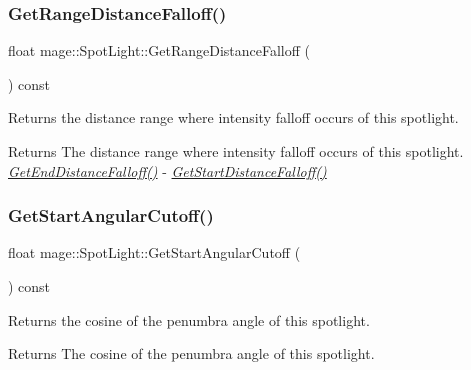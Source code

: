 \subsubsection{\texorpdfstring{Get\+Range\+Distance\+Falloff()}{GetRangeDistanceFalloff()}}
{\footnotesize\ttfamily float mage\+::\+Spot\+Light\+::\+Get\+Range\+Distance\+Falloff (\begin{DoxyParamCaption}{ }\end{DoxyParamCaption}) const\hspace{0.3cm}{\ttfamily [noexcept]}}

Returns the distance range where intensity falloff occurs of this spotlight.

\begin{DoxyReturn}{Returns}
The distance range where intensity falloff occurs of this spotlight. {\itshape \hyperlink{classmage_1_1_spot_light_a4d1d2c3a5f5b2a01e6e625d84eb588d1}{Get\+End\+Distance\+Falloff()}} -\/ {\itshape \hyperlink{classmage_1_1_spot_light_a98a5da32f0023d8f0d600fe3f362decd}{Get\+Start\+Distance\+Falloff()}} 
\end{DoxyReturn}
\hypertarget{classmage_1_1_spot_light_ae221dd2747e65d01fcbf2a9b08c54abd}{}\label{classmage_1_1_spot_light_ae221dd2747e65d01fcbf2a9b08c54abd} 
\subsubsection{\texorpdfstring{Get\+Start\+Angular\+Cutoff()}{GetStartAngularCutoff()}}
{\footnotesize\ttfamily float mage\+::\+Spot\+Light\+::\+Get\+Start\+Angular\+Cutoff (\begin{DoxyParamCaption}{ }\end{DoxyParamCaption}) const\hspace{0.3cm}{\ttfamily [noexcept]}}

Returns the cosine of the penumbra angle of this spotlight.

\begin{DoxyReturn}{Returns}
The cosine of the penumbra angle of this spotlight. 
\end{DoxyReturn}
\hypertarget{classmage_1_1_spot_light_a98a5da32f0023d8f0d600fe3f362decd}{}\label{classmage_1_1_spot_light_a98a5da32f0023d8f0d600fe3f362decd} 
